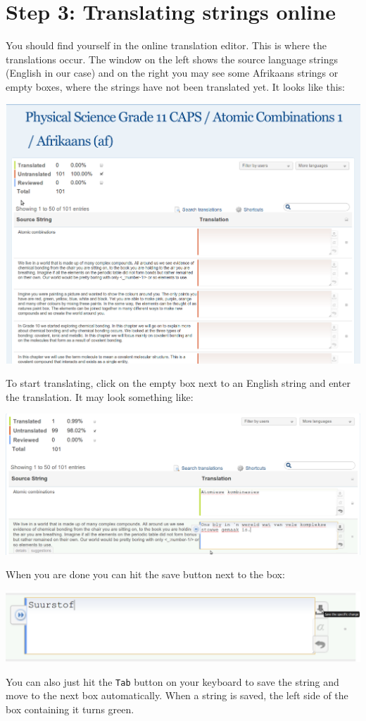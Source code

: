 \documentclass[10pt, a4paper]{article}
\begin{document}
\section*{Step 3: Translating strings online}
You should find yourself in the online translation editor. This is where the translations occur. The window on the left shows the source language strings (English in our case) and on the right you may see some Afrikaans strings or empty boxes, where the strings have not been translated yet. It looks like this:
\begin{center}
    \centerline{\includegraphics[width=0.8\paperwidth]{images/translatestrings.png}}
\end{center}


To start translating, click on the empty box next to an English string and enter the translation. It may look something like:
\begin{center}
    \centerline{\includegraphics[width=0.8\paperwidth]{images/translating.png}}
\end{center}

When you are done you can hit the save button next to the box:
\begin{center}
    \centerline{\includegraphics[width=0.8\paperwidth]{images/saving.png}}
\end{center}
You can also just hit the \texttt{Tab} button on your keyboard to save the string and move to the next box automatically. When a string is saved, the left side of the box containing it turns green.
\end{document}
